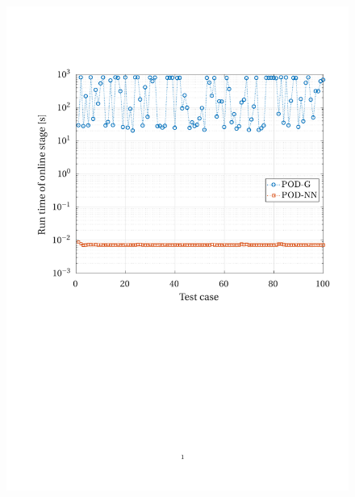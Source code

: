 \documentclass[12pt, a4paper, twoside, openright]{report}
\numberwithin{equation}{chapter}
\theoremstyle{theorem}
\theoremstyle{definition}
\theoremstyle{remark}
\theoremstyle{proposition}
\numberwithin{figure}{chapter}
\begin{document}
\begin{figure}[H]
	\end{figure}
	
	\begin{figure}[H]
		\center
		\includegraphics[scale = 0.75, trim = {1.5cm 11cm 1cm 3.5cm}, clip]{dc_400_time}
	\end{figure}
	
\end{document}
